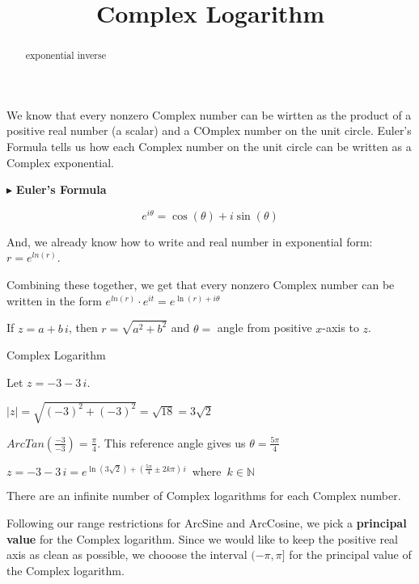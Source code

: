 \documentclass{ximera}
\title{Complex Logarithm}
\begin{document}
\begin{abstract}
exponential inverse
\end{abstract}
\maketitle





We know that every nonzero Complex number can be wirtten as the product of a positive real number (a scalar) and a COmplex number on the unit circle.  Euler's Formula tells us how each Complex number on the unit circle can be written as a Complex exponential.


$\blacktriangleright$ \textbf{Euler's Formula}


\[   e^{i \theta} = \cos(\theta) + i \sin(\theta)         \]


And, we already know how to write and real number in exponential form: $r = e^{ln(r)}$.  

Combining these together, we get that every nonzero Complex number can be written in the form  $e^{ln(r)} \cdot e^{i t} = e^{\ln(r) + i \theta}$




If $z = a + b \, i$, then $r = \sqrt{a^2 + b^2}$ and $\theta = $ angle from positive $x$-axis to $z$.







\begin{example} Complex Logarithm


Let $z = -3 - 3 \, i$.


$|z| = \sqrt{(-3)^2 + (-3)^2} =  \sqrt{18} = 3 \sqrt{2}$


$ArcTan\left(\frac{-3}{-3}\right) = \frac{\pi}{4}$.  This reference angle gives us $\theta = \frac{5 \pi}{4}$




$z = -3 - 3 \, i =  e^{\ln(3 \sqrt{2}) + (\tfrac{5 \pi}{4} \pm 2 k \pi) \, i}     \, \text{ where } \, k \in \mathbb{N}  $

\end{example}




There are an infinite number of Complex logarithms for each Complex number.


Following our range restrictions for ArcSine and ArcCosine, we pick a \textbf{principal value} for the Complex logarithm. Since we would like to keep the positive real axis as clean as possible, we chooose the interval $(-\pi, \pi]$ for the principal value of the Complex logarithm.
\end{document}
